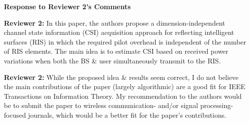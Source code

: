 \documentclass[a4paper,12pt]{article}
\begin{document}
{}

\clearpage


\begin{center}
    {\Large\bf Response to Reviewer 2's Comments}
\end{center}

\textbf{Reviewer 2:}
In this paper, the authors propose a dimension-independent channel state information (CSI) acquisition approach for reflecting intelligent surfaces (RIS) in which the required pilot overhead is independent of the number of RIS elements. The main idea is to estimate CSI based on received power variations when both the BS \& user simultaneously transmit to the RIS.

{}


\textbf{Reviewer 2:}
While the proposed idea \& results seem correct, I do not believe the main contributions of the paper (largely algorithmic) are a good fit for IEEE Transactions on Information Theory. My recommendation to the authors would be to submit the paper to wireless communication- and/or signal processing-focused journals, which would be a better fit for the paper's contributions.
\end{document}
